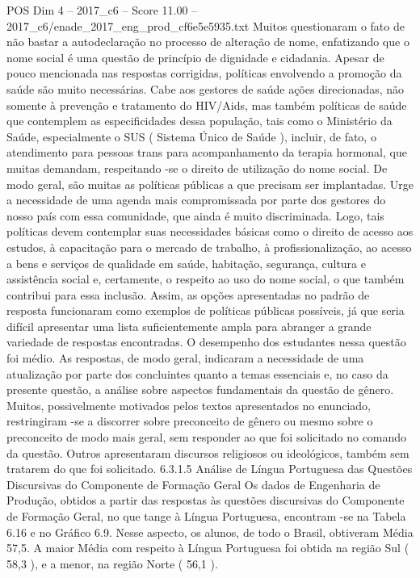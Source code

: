 \begin{textsample}{POS Dim 4 – 2017\_c6 – Score 11.00 – 2017\_c6/enade\_2017\_eng\_prod\_cf6e5e5935.txt}
Muitos questionaram o fato de não bastar a autodeclaração no processo de alteração de nome, enfatizando que o nome social é uma questão de princípio de dignidade e cidadania.
Apesar de pouco mencionada nas respostas corrigidas, políticas envolvendo a promoção da saúde são muito necessárias.
Cabe aos gestores de saúde ações direcionadas, não somente à prevenção e tratamento do HIV/Aids, mas também políticas de saúde que contemplem as especificidades dessa população, tais como o Ministério da Saúde, especialmente o SUS ( Sistema Único de Saúde ), incluir, de fato, o atendimento para pessoas trans para acompanhamento da terapia hormonal, que muitas demandam, respeitando -se o direito de utilização do nome social.
De modo geral, são muitas as políticas públicas a que precisam ser implantadas.
Urge a necessidade de uma agenda mais compromissada por parte dos gestores do nosso país com essa comunidade, que ainda é muito discriminada.
Logo, tais políticas devem contemplar suas necessidades básicas como o direito de acesso aos estudos, à capacitação para o mercado de trabalho, à profissionalização, ao acesso a bens e serviços de qualidade em saúde, habitação, segurança, cultura e assistência social e, certamente, o respeito ao uso do nome social, o que também contribui para essa inclusão.
Assim, as opções apresentadas no padrão de resposta funcionaram como exemplos de políticas públicas possíveis, já que seria difícil apresentar uma lista suficientemente ampla para abranger a grande variedade de respostas encontradas.
O desempenho dos estudantes nessa questão foi médio.
As respostas, de modo geral, indicaram a necessidade de uma atualização por parte dos concluintes quanto a temas essenciais e, no caso da presente questão, a análise sobre aspectos fundamentais da questão de gênero.
Muitos, possivelmente motivados pelos textos apresentados no enunciado, restringiram -se a discorrer sobre preconceito de gênero ou mesmo sobre o preconceito de modo mais geral, sem responder ao que foi solicitado no comando da questão.
Outros apresentaram discursos religiosos ou ideológicos, também sem tratarem do que foi solicitado. 6.3.1.5 Análise de Língua Portuguesa das Questões Discursivas do Componente de Formação Geral Os dados de Engenharia de Produção, obtidos a partir das respostas às questões discursivas do Componente de Formação Geral, no que tange à Língua Portuguesa, encontram -se na Tabela 6.16 e no Gráfico 6.9.
Nesse aspecto, os alunos, de todo o Brasil, obtiveram Média 57,5.
A maior Média com respeito à Língua Portuguesa foi obtida na região Sul ( 58,3 ), e a menor, na região Norte ( 56,1 ).

\end{textsample}
